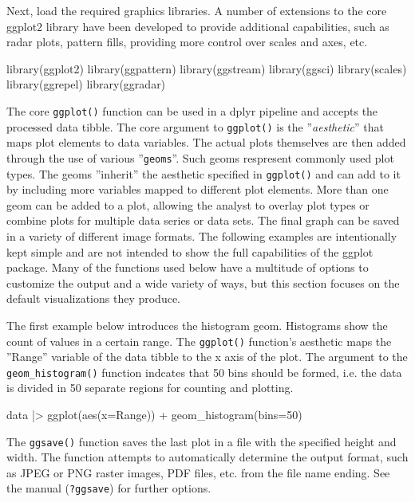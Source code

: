 \noindent Next, load the required graphics libraries. A number of extensions to the core ggplot2 library have been developed to provide additional capabilities, such as radar plots, pattern fills, providing more control over scales and axes, etc.

\begin{Rcode}
library(ggplot2)
library(ggpattern)
library(ggstream)
library(ggsci)
library(scales)
library(ggrepel)
library(ggradar)
\end{Rcode}

The core \texttt{ggplot()} function can be used in a dplyr pipeline and accepts the processed data tibble. The core argument to \texttt{ggplot()} is the ''\emph{aesthetic}'' that maps plot elements to data variables. The actual plots themselves are then added through the use of various ''\texttt{geoms}''. Such geoms respresent commonly used plot types. The geoms ''inherit'' the aesthetic specified in \texttt{ggplot()} and can add to it by including more variables mapped to different plot elements. More than one geom can be added to a plot, allowing the analyst to overlay plot types or combine plots for multiple data series or data sets. The final graph can be saved in a variety of different image formats. The following examples are intentionally kept simple and are not intended to show the full capabilities of the ggplot package. Many of the functions used below have a multitude of options to customize the output and a wide variety of ways, but this section focuses on the default visualizations they produce.

The first example below introduces the histogram geom. Histograms show the count of values in a certain range. The \texttt{ggplot()} function's aesthetic maps the ''Range'' variable of the data tibble to the x axis of the plot. The argument to the \texttt{geom\_histogram()} function indcates that 50 bins should be formed, i.e. the data is divided in 50 separate regions for counting and plotting.

\begin{Rcode}
data |> 
  ggplot(aes(x=Range)) + 
    geom_histogram(bins=50)
\end{Rcode}

The \texttt{ggsave()} function saves the last plot in a file with the specified height and width. The function attempts to automatically determine the output format, such as JPEG or PNG raster images, PDF files, etc. from the file name ending. See the manual (\texttt{?ggsave}) for further options. 

